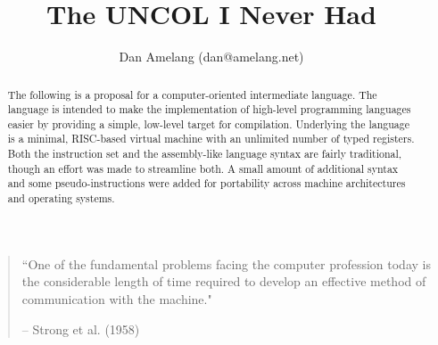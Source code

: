 \documentclass[10pt]{article}
\begin{document}
\twocolumn

\title{The UNCOL I Never Had}
\author{Dan Amelang (dan@amelang.net)}
\maketitle

\begin{quotation}\small
``One of the fundamental problems facing the computer profession today is the considerable
length of time required to develop an effective method of communication with the machine."

-- Strong et al. (1958)
\end{quotation}

\begin{abstract}

The following is a proposal for a computer-oriented intermediate language.
The language is intended to make the implementation of high-level programming
languages easier by providing a simple, low-level target for compilation.
Underlying the language is a
minimal, RISC-based virtual machine with an unlimited number of typed registers.
Both the instruction set and the assembly-like language syntax are fairly
traditional, though an effort was made to streamline both.
A small amount of additional syntax and some pseudo-instructions were added
for portability across machine architectures and operating systems.

\end{abstract}






%



\end{document}
